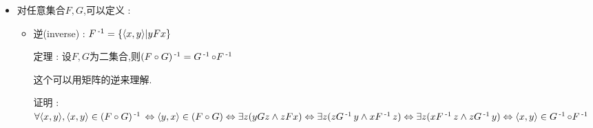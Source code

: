 {{{{\begin{itemize}
{            \begin{itemize}
              \item 定义域(domain) : $dom\ R = \set{x | \exists y(x R y)}$
              \item 值域(range) : $ran\ R = \set{y | \exists x(x R y)}$
              \item 域(field) : $fld\ R = dom\ R \unionSet ran\ R$
            \end{itemize}

            例 : \begin{itemize}
              \item $R_1 = \set{a,b}$
              \item $R_2 = \set{a,b,\dependent{c,d},\dependent{e,f}}$
              \item $R_3 = \set{\dependent{1,2}, \dependent{3,4}, \dependent{5,6}}$
            \end{itemize}

            当$a,b$不是有序对时,$R_1$和$R_2$不是关系.
            \begin{itemize}
              \item $dom\ R_1 = \emptyset,ran\ R_1 = \emptyset,fld\ R_1 = \emptyset$
              \item $dom\ R_2 = \set{c,e}, ran\ R_2 = \set{d,f},fld\ R_2 = \set{c,d,e,f}$
              \item $dom\ R_3 = \set{1,3,5}, ran\ R_3 = \set{2,4,6}, fld\ R_3 \set{1,2,3,4,5,6}$
            \end{itemize}
            }
      \item {
            对任意集合$F,G$,可以定义 :

            \begin{itemize}
              \item {
                    逆(inverse) : $F\operatorname{^{-1}} = \left\{ \langle x,y\rangle | yFx \right\}$

                    定理 : 设$F,G$为二集合,则$(F \circ G)\operatorname{^{-1}} = G\operatorname{^{-1}} \circ F\operatorname{^{-1}}$

                    这个可以用矩阵的逆来理解.

                    证明 : \begin{math}
                      \forall \langle x,y\rangle,\langle x,y\rangle \in (F \circ G)\operatorname{^{-1}} \\
                      \Leftrightarrow \langle y,x\rangle \in (F \circ G) \\
                      \Leftrightarrow \exists z (yGz \land zFx) \\
                      \Leftrightarrow \exists z (z G\operatorname{^{-1}} y \land x F\operatorname{^{-1}} z) \\
                      \Leftrightarrow \exists z (x F\operatorname{^{-1}} z \land z G\operatorname{^{-1}} y) \Leftrightarrow \langle x,y\rangle \in G\operatorname{^{-1}} \circ F\operatorname{^{-1}}
                    \end{math}

}
\end{itemize}}
\end{itemize}}}}}
